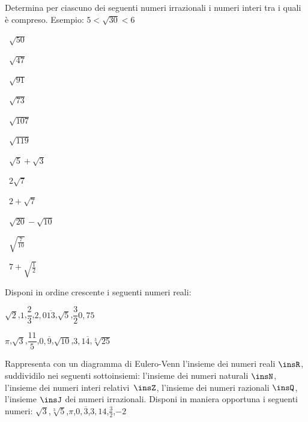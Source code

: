 \begin{esercizio}
\label{ese:1.4}
 Determina per ciascuno dei seguenti numeri irrazionali i numeri interi tra i quali è compreso. Esempio: $5<\sqrt{30}<6$
\begin{multicols}{4}
\begin{enumeratea}
 \item~$\sqrt{50}$
 \item~$\sqrt{47}$
 \item~$\sqrt{91}$
 \item~$\sqrt{73}$
 \item~$\sqrt{107}$
 \item~$\sqrt{119}$
 \item~$\sqrt 5+\sqrt 3$
 \item~$2\sqrt 7$
 \item~$2+\sqrt 7$
 \item~$\sqrt{20}-\sqrt{10}$
 \item~$\sqrt{\frac 7{10}}$
 \item~$7+\sqrt{\frac 1 2}$
\end{enumeratea}
\end{multicols}
\end{esercizio}

\begin{esercizio}
\label{ese:1.5}
 Disponi in ordine crescente i seguenti numeri reali:
 \begin{enumeratea}
 \item $\sqrt 2$,\quad $1$,\quad $\dfrac 2 3$,\quad $2,0\overline{13}$,\quad $\sqrt 5$,\quad $\dfrac 3 2$\quad $0,75$
 \item $\pi$,\quad $\sqrt 3$,\quad $\dfrac{11} 5$,\quad $0,\overline 9$,\quad $\sqrt{10}$,\quad $3,1\overline 4$,\quad $\sqrt[3]{25}$
 \end{enumeratea}
\end{esercizio}

\begin{esercizio}
\label{ese:1.6}
 Rappresenta con un diagramma di Eulero-Venn l'insieme dei numeri reali $\insR$, suddividilo nei seguenti sottoinsiemi: l'insieme dei numeri naturali $\insN$, l'insieme dei numeri interi relativi~$\insZ$, l'insieme dei numeri razionali $\insQ$, l'insieme $\insJ$ dei numeri irrazionali. Disponi in maniera opportuna i seguenti numeri: $\sqrt 3$,\quad $\sqrt[3]5$,\quad$\pi$,\quad $0,\overline 3$,\quad $3,14$,\quad $\frac 3 2$,\quad$-2$
\end{esercizio}


